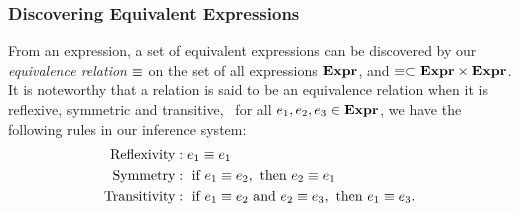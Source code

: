 \subsubsection{Discovering Equivalent Expressions}

From an expression, a set of equivalent expressions can be discovered by our
\emph{equivalence relation} $\equiv$ on the set of all expressions $\mathbf{Expr}$,
and $\equiv \subset \mathbf{Expr}\times\mathbf{Expr}$.  It is noteworthy that a relation
is said to be an equivalence relation when it is reflexive, symmetric and
transitive, \ie~for all $e_1, e_2, e_3 \in \mathbf{Expr}$, we have the following
rules in our inference system:
\begin{equation}
    \begin{aligned}
        \text{Reflexivity}
            &: e_1 \equiv e_1 \\
        \text{Symmetry}
            &: \text{~if~} e_1 \equiv e_2,
            \text{~then~} e_2 \equiv e_1 \\
        \text{Transitivity}
            &: \text{~if~} e_1 \equiv e_2 \text{~and~} e_2 \equiv e_3,
            \text{~then~} e_1 \equiv e_3.
    \end{aligned}
    \label{so:eq:equivalence_relation}
\end{equation}

